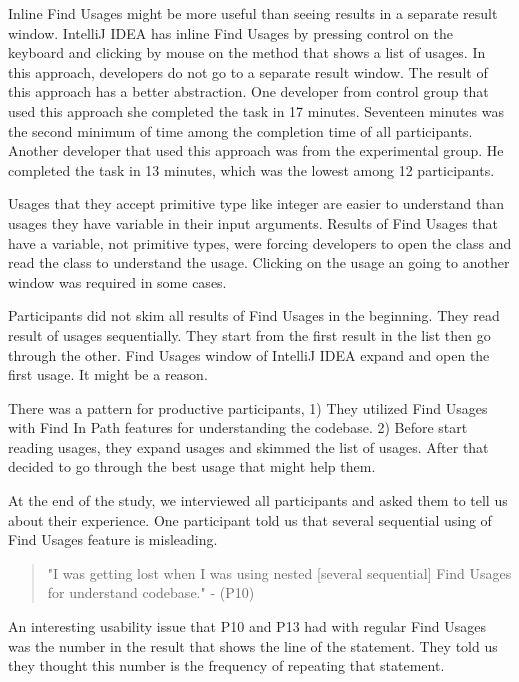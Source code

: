 \documentclass[conference]{IEEEtran}
\begin{document}
Inline Find Usages might be more useful than seeing results in a separate result window. IntelliJ IDEA has inline Find Usages by pressing control on the keyboard and clicking by mouse on the method that shows a list of usages. In this approach, developers do not go to a separate result window. The result of this approach has a better abstraction. One developer from control group that used this approach she completed the task in 17 minutes. Seventeen minutes was the second minimum of time among the completion time of all participants. Another developer that used this approach was from the experimental group. He completed the task in 13 minutes, which was the lowest among 12 participants. \par

Usages that they accept primitive type like integer are easier to understand than usages they have variable in their input arguments. Results of Find Usages that have a variable, not primitive types, were forcing developers to open the class and read the class to understand the usage. Clicking on the usage an going to another window was required in some cases.\par

Participants did not skim all results of Find Usages in the beginning. They read result of usages sequentially. They start from the first result in the list then go through the other. Find Usages window of IntelliJ IDEA expand and open the first usage. It might be a reason.\par

There was a pattern for productive participants, 1) They utilized Find Usages with Find In Path features for understanding the codebase.  2) Before start reading usages, they expand usages and skimmed the list of usages. After that decided to go through the best usage that might help them. \par

At the end of the study, we interviewed all participants and asked them to tell us about their experience. One participant told us that several sequential using of Find Usages feature is misleading.
\begin{quote} "I was getting lost when I was using nested [several sequential] Find Usages for understand codebase." - (P10)\end{quote}

 An interesting usability issue that P10 and P13 had with regular Find Usages was the number in the result that shows the line of the statement. They told us they thought this number is the frequency of repeating that statement.\par
 
\end{document}
